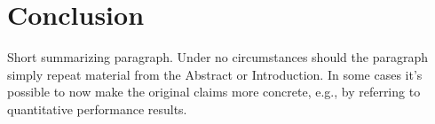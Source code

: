 \section{Conclusion}
\label{conclusion}

Short summarizing paragraph. Under no circumstances should the paragraph simply repeat material from the Abstract or Introduction. In some cases it's possible to now make the original claims more concrete, e.g., by referring to quantitative performance results.
